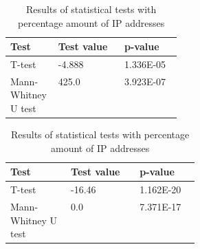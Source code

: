 \documentclass[a4paper,10pt]{article}
\begin{document}
\begin{table}[H]
    \centering
    \begin{minipage}{0.45\linewidth} \centering
        \begin{tabularx}{\linewidth}{p{0.29\linewidth}XX}
            \toprule
            Test & Test value & p-value  \\
            \midrule
            T-test & -4.888 & 1.336E-05 \\
            Mann-Whitney U test & 425.0 & 3.923E-07 \\
            \bottomrule
        \end{tabularx}
        \caption{Results of statistical tests with exact amount of IP addresses}
        \label{tbl:stats_exact}
    \end{minipage}
    \hspace{0.01\linewidth}
    \begin{minipage}{0.45\linewidth} \centering
        \begin{tabularx}{\linewidth}{p{0.32\linewidth}XX}
            \toprule
            Test & Test value & p-value  \\
            \midrule
            T-test & -16.46 & 1.162E-20 \\
            Mann-Whitney U test & 0.0 & 7.371E-17\\
            \bottomrule
        \end{tabularx}
        \caption{Results of statistical tests with percentage amount of IP addresses}
        \label{tbl:stats_percent}
    \end{minipage}
\end{table}
\end{document}
